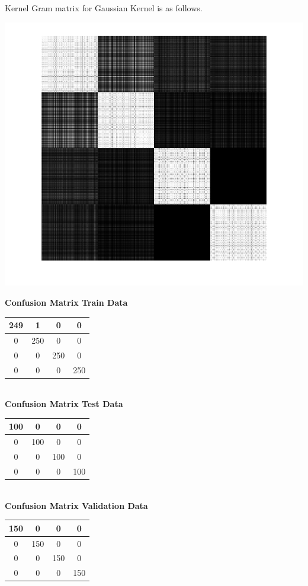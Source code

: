 \documentclass{article}
\begin{document}
Kernel Gram matrix for Gaussian Kernel is as follows.
\begin{center}
\includegraphics[scale=0.6]{Classification/1a/nu_g/kgm}
\end{center}

\begin{flushleft}
\newpage
\textbf{Confusion Matrix Train Data\\[5pt]}
\begin{tabular}{|c|c|c|c|}
\hline
249 & 1 & 0 & 0 \\
\hline
0 & 250 & 0 & 0 \\
\hline
0 & 0 & 250 & 0 \\
\hline
0 & 0 & 0 & 250 \\
\hline
\end{tabular}
\textbf{\\[10pt] Confusion Matrix Test Data \\[5pt]}
\begin{tabular}{|c|c|c|c|}
\hline
100 & 0 & 0 & 0 \\
\hline
0 & 100 & 0 & 0 \\
\hline
0 & 0 & 100 & 0 \\
\hline
0 & 0 & 0 & 100 \\
\hline
\end{tabular}
\textbf{\\[10pt] Confusion Matrix Validation Data \\[5pt]}
\begin{tabular}{|c|c|c|c|}
\hline
150 & 0 & 0 & 0 \\
\hline
0 & 150 & 0 & 0 \\
\hline
0 & 0 & 150 & 0 \\
\hline
0 & 0 & 0 & 150 \\
\hline
\end{tabular}
\end{flushleft}
\end{document}
